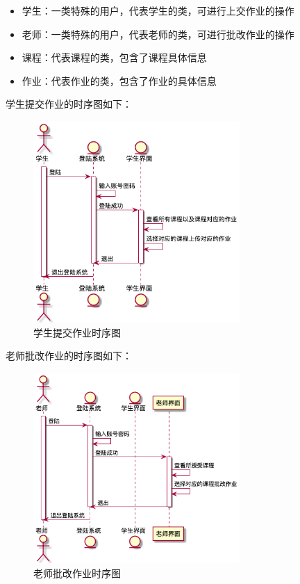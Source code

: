 \documentclass{article}
\begin{document}
\begin{enumerate}[label=\arabic*.]
\begin{itemize}
            \item 学生：一类特殊的用户，代表学生的类，可进行上交作业的操作
            \item 老师：一类特殊的用户，代表老师的类，可进行批改作业的操作
            \item 课程：代表课程的类，包含了课程具体信息
            \item 作业：代表作业的类，包含了作业的具体信息
        \end{itemize}
        学生提交作业的时序图如下：\\
        \begin{figure}[H]
            \centering
            \includegraphics[width=0.7\textwidth]{./fig/hw02/2_student.png}
            \caption{学生提交作业时序图}
        \end{figure}
        老师批改作业的时序图如下：\\
        \begin{figure}[H]
            \centering
            \includegraphics[width=0.7\textwidth]{./fig/hw02/2_teacher.png}
            \caption{老师批改作业时序图}
        \end{figure}
    \end{enumerate}
\end{document}
